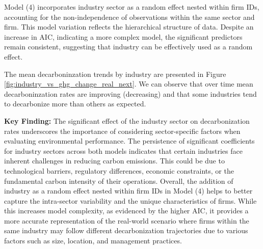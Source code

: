 Model (4) incorporates industry sector as a random effect nested within firm IDs, accounting for the non-independence of observations within the same sector and firm. This model variation reflects the hierarchical structure of data. Despite an increase in AIC, indicating a more complex model, the significant predictors remain consistent, suggesting that industry can be effectively used as a random effect.


The mean decarboninzation trends by industry are presented in Figure \ref{fig:industry_vs_ghg_change_real_next}. We can observe that over time mean decarboninzation rates are improving (decreasing) and that some industries tend to decarbonize more than others as expected.


\textbf{Key Finding:} The significant effect of the industry sector on decarbonization rates underscores the importance of considering sector-specific factors when evaluating environmental performance. The persistence of significant coefficients for industry sectors across both models indicates that certain industries face inherent challenges in reducing carbon emissions. This could be due to technological barriers, regulatory differences, economic constraints, or the fundamental carbon intensity of their operations. Overall, the addition of industry as a random effect nested within firm IDs in Model (4) helps to better capture the intra-sector variability and the unique characteristics of firms. While this increases model complexity, as evidenced by the higher AIC, it provides a more accurate representation of the real-world scenario where firms within the same industry may follow different decarbonization trajectories due to various factors such as size, location, and management practices.
    

